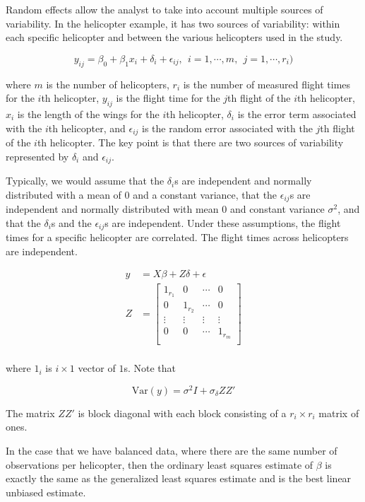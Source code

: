 \documentclass[12pt]{article}
\begin{document}
Random effects allow the analyst to take into account multiple sources of variability. In the helicopter example, it has two sources of variability: within each specific helicopter and between the various helicopters used in the study. 

$$
y_{ij} = \beta_0 + \beta_1 x_i + \delta_i + \epsilon_{ij}, \ \ i=1, \cdots, m, \ \ j=1,\cdots, r_i) 
$$

where $m$ is the number of helicopters, $r_i$ is the number of measured flight times for the $i$th helicopter, $y_{ij}$ is the flight time for the $j$th flight of the $i$th helicopter, $x_i$ is the length of the wings for the $i$th helicopter, $\delta_i$ is the error term associated with the $i$th helicopter, and $\epsilon_{ij}$ is the random error associated with the $j$th flight of the $i$th helicopter. The key point is that there are two sources of variability represented by $\delta_i$ and $\epsilon_{ij}$.

Typically, we would assume that the $\delta_i$s are independent and normally distributed with a mean of $0$ and a constant variance, that the $\epsilon_{ij}$s are independent and normally distributed with mean $0$ and constant variance $\sigma^2$, and that the $\delta_i$s and the $\epsilon_{ij}$s are independent. Under these assumptions, the flight times for a specific helicopter are correlated. The flight times across helicopters are independent.


$$
\begin{aligned}
y &= X\beta + Z\delta + \epsilon \\[10pt]
Z &= \begin{bmatrix} 1_{r_1} & 0 & \cdots & 0 \\
                     0 & 1_{r_2} & \cdots & 0 \\ 
                     \vdots  & \vdots & \vdots & \vdots \\
                     0 & 0 & \cdots & 1_{r_m} \\  \end{bmatrix} \\[10pt]
\end{aligned}
$$

where $1_i$ is $i \times 1$ vector of $1$s. Note that 

$$
\mathrm{Var}(y) = \sigma^2 I + \sigma_\delta Z Z'
$$

The matrix $ZZ′$ is block diagonal with each block consisting of a $r_i \times r_i$ matrix of ones.

In the case that we have balanced data, where there are the same number of observations per helicopter, then the ordinary least squares estimate of $\beta$ is exactly the same as the generalized least squares estimate and is the best linear unbiased estimate.
\end{document}
